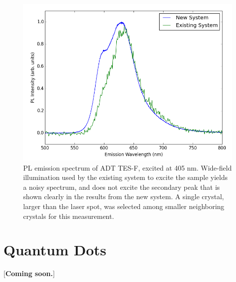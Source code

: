 \begin{figure}[h]
    \centering
    \includegraphics[width=.8\textwidth]{./img/tesf-2.png}%
    \caption[PL emission spectrum of ADT TES-F, excited at 405nm.]{PL emission spectrum of ADT TES-F, excited at 405 nm.
    Wide-field illumination used by the existing system to excite the sample
    yields a noisy spectrum, and does not excite the secondary peak that is 
    shown clearly in the results from the new system. A single crystal, larger than the laser spot, was selected among smaller neighboring crystals for this measurement. %
    }
    \label{fig:pl-adt-tesf}
\end{figure}

\section{ Quantum Dots}

[\textbf{Coming soon.}]


